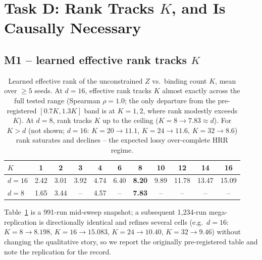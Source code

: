 \section{Task D: Rank Tracks $K$, and Is Causally Necessary}
\label{sec:taskd}

\subsection{M1 -- learned effective rank tracks $K$}
\label{sec:taskd-m1}

\begin{table}[t]
\centering
\scriptsize
\setlength{\tabcolsep}{2.4pt}
\begin{tabular}{lcccccccccc}
\toprule
$K$ & 1 & 2 & 3 & 4 & 6 & 8 & 10 & 12 & 14 & 16 \\
\midrule
$d{=}16$ & 2.42 & 3.01 & 3.92 & 4.74 & 6.40 & \textbf{8.20} & 9.89 & 11.78 & 13.47 & 15.09 \\
$d{=}8$  & 1.65 & 3.44 & --   & 4.57 & --   & \textbf{7.83} & --    & --    & --    & --    \\
\bottomrule
\end{tabular}
\caption{Learned effective rank of the unconstrained $Z$ vs.\ binding count
$K$, mean over $\geq 5$ seeds. At $d{=}16$, effective rank tracks $K$
almost exactly across the full tested range (Spearman $\rho=1.0$; the only
departure from the pre-registered $[0.7K,1.3K]$ band is at $K{=}1,2$, where
rank modestly exceeds $K$). At $d{=}8$, rank tracks $K$ up to the ceiling
($K{=}8\to7.83\approx d$). For $K>d$ (not shown; $d{=}16$: $K{=}20\to11.1$,
$K{=}24\to11.6$, $K{=}32\to8.6$) rank saturates and declines -- the
expected lossy over-complete HRR regime.}
\label{tab:taskd-m1}
\end{table}

Table~\ref{tab:taskd-m1} is a 991-run mid-sweep snapshot; a subsequent
1{,}234-run mega-replication is directionally identical and refines several
cells (e.g.\ $d{=}16$: $K{=}8\to8.198$, $K{=}16\to15.083$, $K{=}24\to10.40$,
$K{=}32\to9.46$) without changing the qualitative story, so we report the
originally pre-registered table and note the replication for the record.

